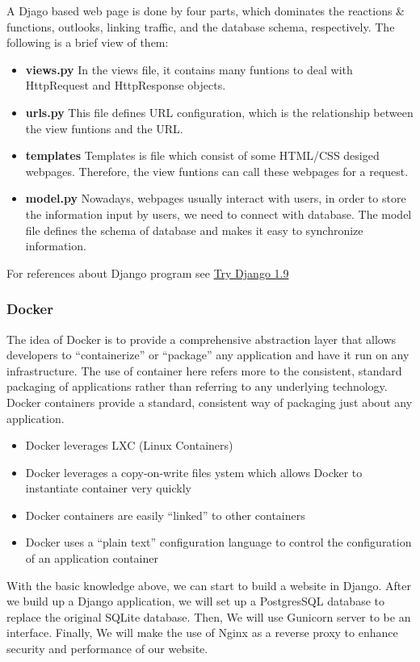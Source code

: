 A Djago based web page is done by four parts, which dominates the reactions 
\& functions, outlooks, linking traffic, and the database schema, respectively. 
The following is a brief view of them:
\begin{itemize}
	\item[] \textbf{views.py}
	In the views file, it contains many funtions to deal with HttpRequest and  HttpResponse objects.
	\item[] \textbf{urls.py}
	This file defines URL configuration, which is the relationship between the view funtions and the URL.
	\item[] \textbf{templates}
	Templates is file which consist of some HTML/CSS desiged webpages. Therefore, the view funtions can call these webpages for a request.
	\item[] \textbf{model.py}
	Nowadays, webpages usually interact with users, in order to store the information input by users, we need to connect with database. 
	The model file defines the schema of database and makes it easy to synchronize information.\\
\end{itemize}
For references about Django program see \href{https://www.youtube.com/watch?v=yfgsklK_yFo&list=PLEsfXFp6DpzQFqfCur9CJ4QnKQTVXUsRy&index=1}{Try Django 1.9}
\subsubsection*{Docker}
The idea of Docker is to provide a comprehensive abstraction
layer that allows developers to “containerize” or “package” 
any application and have it run on any infrastructure. The 
use of container here refers more to the consistent, standard 
packaging of applications rather than referring to any underlying 
technology. Docker containers provide a standard, consistent way 
of packaging just about any application. 
\begin{itemize}
	\item Docker leverages LXC (Linux Containers)
	\item Docker leverages a copy-on-write files ystem which allows Docker to instantiate container very quickly
	\item Docker containers are easily “linked” to other containers
	\item Docker uses a “plain text” configuration language to control the configuration of an application container
\end{itemize}


With the basic knowledge above, we can start to build a website in Django. 
After we build up a Django application, we will set up a PostgresSQL database to replace the original SQLite database. 
Then, We will use Gunicorn server to be an interface. Finally, We will make the use of Nginx as a reverse proxy to enhance security and performance of our website.